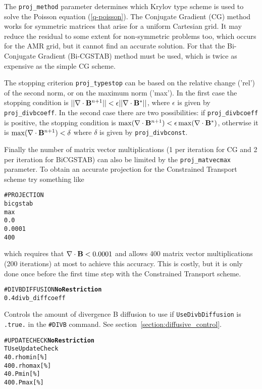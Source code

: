 The {\tt proj\_method} parameter determines which Krylov type scheme is used
to solve the Poisson equation (\ref{q-poisson}). The Conjugate Gradient (CG) 
\cite{hestenes-stiefel}
method works for symmetric matrices that arise for a uniform Cartesian grid.
It may reduce the residual to some extent for non-symmetric problems too,
which occurs for the AMR grid, but it cannot find an accurate solution.
For that the Bi-Conjugate Gradient (Bi-CGSTAB) method 
\cite{vandervorst}
must be used, which is twice as expensive as the simple CG scheme.

The stopping criterion {\tt proj\_typestop} can be based on the relative change
('rel') of the second norm, or on the maximum norm ('max'). In the first
case the stopping condition is $||\nabla\cdot\mathbf{B}^{n+1}||<\epsilon||\nabla\cdot\mathbf{B}^*||$,
where $\epsilon$ is given by {\tt proj\_divbcoeff}. 
In the second case there are
two possibilities: if {\tt proj\_divbcoeff} is positive, the stopping condition
is $\max(\nabla\cdot\mathbf{B}^{n+1})<\epsilon\max(\nabla\cdot\mathbf{B}^*)$, otherwise it is
$\max(\nabla\cdot\mathbf{B}^{n+1})<\delta$ where $\delta$ is given by {\tt proj\_divbconst}. 

Finally the number of matrix vector multiplications (1 per iteration for CG
and 2 per iteration for BiCGSTAB) can also be limited by the 
{\tt proj\_matvecmax} parameter. To obtain an accurate projection 
for the Constrained Transport scheme try something like
\begin{verbatim}
#PROJECTION
bicgstab
max
0.0
0.0001
400
\end{verbatim}
which requires that $\nabla\cdot\mathbf{B}<0.0001$ and allows 400 matrix vector multiplications
(200 iterations) at most to achieve this accuracy. This is costly, but it is
only done once before the first time step with the Constrained Transport 
scheme.
\ \ \\

\begin{alltt}
#DIVBDIFFUSION   \hfill   {\bf No Restriction}
0.4                    divb_diffcoeff  
\end{alltt}

Controls the amount  of divergence B diffusion to use if {\tt UseDivbDiffusion}
is {\tt .true.} in the {\tt \#DIVB} command.
See section~\ref{section:diffusive_control}.
\ \ \\

\begin{alltt}
#UPDATECHECK     \hfill    {\bf No Restriction}
T                      UseUpdateCheck
40.                    rhomin[\%]
400.                   rhomax[\%]
40.                    Pmin[\%]
400.                   Pmax[\%]
\end{alltt}

